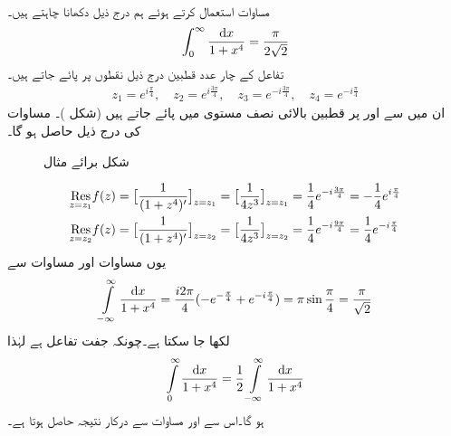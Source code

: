 \quad {}\\
مساوات  استعمال کرتے ہوئے ہم درج ذیل دکھانا چاہتے ہیں۔
\begin{align*}
\int_0^{\infty} \frac{\dif x}{1+x^4}=\frac{\pi}{2\sqrt{2}}
\end{align*}
تفاعل  کے چار عدد قطبین درج ذیل نقطوں پر پائے جاتے ہیں۔
\begin{align*}
z_1=e^{i\tfrac{\pi}{4}}, \quad z_2=e^{i\tfrac{3\pi}{4}},\quad z_3=e^{-i\tfrac{3\pi}{4}},\quad z_4=e^{-i\tfrac{\pi}{4}}
\end{align*}
ان میں سے  اور  پر قطبین بالائی نصف مستوی میں پائے جاتے ہیں (شکل )۔ مساوات  کی درج ذیل حاصل ہو گا۔
\begin{figure}
\centering
{}
\caption{شکل برائے مثال }
\label{شکل_مثال_بقیہ_غیر_مناسب}
\end{figure}
%
\begin{align*}
\underset{z=z_1\hfill}{\Res} f(z)&=\big[\frac{1}{(1+z^4)'}\big]_{z=z_1}=\big[\frac{1}{4z^3}\big]_{z=z_1}=\frac{1}{4}e^{-i\frac{3\pi}{4}}=-\frac{1}{4}e^{i\frac{\pi}{4}}\\
\underset{z=z_2\hfill}{\Res} f(z)&=\big[\frac{1}{(1+z^4)'}\big]_{z=z_2}=\big[\frac{1}{4z^3}\big]_{z=z_2}=\frac{1}{4}e^{-i\frac{9\pi}{4}}=\frac{1}{4}e^{-i\frac{\pi}{4}}
\end{align*} 
یوں مساوات  اور  مساوات  سے  
\begin{align}\label{مساوات_بقیہ_مثال_جواب_الف}
\int\limits_{-\infty}^{\infty}\frac{\dif x}{1+x^4}=\frac{i2\pi}{4}(-e^{-\frac{\pi}{4}}+e^{-i\frac{\pi}{4}})=\pi\sin\frac{\pi}{4}=\frac{\pi}{\sqrt{2}}
\end{align}
لکھا جا سکتا ہے۔چونکہ  جفت تفاعل ہے لہٰذا 
\begin{align*}
\int\limits_{0}^{\infty}\frac{\dif x}{1+x^4}=\frac{1}{2}\int\limits_{-\infty}^{\infty}\frac{\dif x}{1+x^4}
\end{align*}
ہو گا۔اس سے اور مساوات  سے درکار نتیجہ حاصل ہوتا ہے۔

